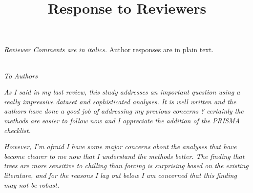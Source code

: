 \documentclass[11pt, a4paper]{article}
\begin{document}
{}


\setlength\parindent{0pt}


\title{Response to Reviewers}
\emph{Reviewer Comments are in italics.} Author responses are in plain text.\\

 \emph{}\\

\par \emph{To Authors}
\par \emph{As I said in my last review, this study addresses an important question using a really impressive
dataset and sophisticated analyses. It is well written and the authors have done a good job of
addressing my previous concerns ? certainly the methods are easier to follow now and I appreciate
the addition of the PRISMA checklist.}\\
\par \emph{However, I'm afraid I have some major concerns about the analyses that have become clearer to me
now that I understand the methods better. The finding that trees are more sensitive to chilling than
forcing is surprising based on the existing literature, and for the reasons I lay out below I am
concerned that this finding may not be robust.}
\end{document}
